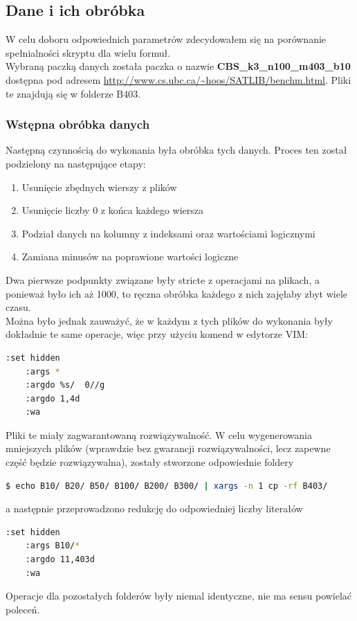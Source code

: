 \documentclass[11pt]{article}
\theoremstyle{note}
\begin{document}
\subsection{Dane i ich obróbka}
W celu doboru odpowiednich parametrów zdecydowałem się na porównanie spełnialności skryptu dla wielu formuł. \\
Wybraną paczką danych została paczka o nazwie \textbf{CBS\_k3\_n100\_m403\_b10} dostępna pod adresem \url{http://www.cs.ubc.ca/~hoos/SATLIB/benchm.html}. Pliki te znajdują się w folderze B403. \\
\subsubsection{Wstępna obróbka danych}


Następną czynnością do wykonania była obróbka tych danych. Proces ten został podzielony na następujące etapy:
\begin{enumerate}
  \item Usunięcie zbędnych wierszy z plików
  \item Usunięcie liczby 0 z końca każdego wiersza
  \item Podział danych na kolumny z indeksami oraz wartościami logicznymi
  \item Zamiana minusów na poprawione wartości logiczne
\end{enumerate}

Dwa pierwsze podpunkty związane były stricte z operacjami na plikach, a ponieważ było ich aż 1000, to ręczna obróbka każdego z nich zajęłaby zbyt wiele czasu. \\
Można było jednak zauważyć, że w każdym z tych plików do wykonania były dokładnie te same operacje, więc przy użyciu komend w edytorze VIM:
\begin{lstlisting}[language=bash]
	:set hidden
	:args *
	:argdo %s/  0//g
	:argdo 1,4d
	:wa
\end{lstlisting}

\noindent Pliki te miały zagwarantowaną rozwiązywalność. W celu wygenerowania mniejszych plików (wprawdzie bez gwarancji rozwiązywalności, lecz zapewne część będzie rozwiązywalna), zostały stworzone odpowiednie foldery
\begin{lstlisting}[language=bash]
$ echo B10/ B20/ B50/ B100/ B200/ B300/ | xargs -n 1 cp -rf B403/
\end{lstlisting}
a następnie przeprowadzono redukcję do odpowiedniej liczby literałów
\begin{lstlisting}[language=bash]
	:set hidden
	:args B10/*
	:argdo 11,403d
	:wa
\end{lstlisting}
Operacje dla pozostałych folderów były niemal identyczne, nie ma sensu powielać poleceń.
\end{document}
